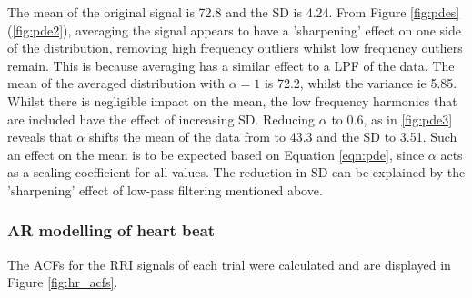 \noindent
The mean of the original signal is 72.8 and the SD is 4.24. From Figure \ref{fig:pdes}(\ref{fig:pde2}), averaging the signal appears to have a 'sharpening' effect on one side of the distribution, removing high frequency outliers whilst low frequency outliers remain. This is because averaging has a similar effect to a LPF of the data. The mean of the averaged distribution with $\alpha = 1$ is 72.2, whilst the variance ie 5.85. Whilst there is negligible impact on the mean, the low frequency harmonics that are included have the effect of increasing SD. Reducing $\alpha $ to 0.6, as in \ref{fig:pde3} reveals that $\alpha$ shifts the mean of the data from to 43.3 and the SD to 3.51. Such an effect on the mean is to be expected based on Equation \ref{eqn:pde}, since $\alpha$ acts as a scaling coefficient for all values. The reduction in SD can be explained by the 'sharpening' effect of low-pass filtering mentioned above.

\subsubsection{AR modelling of heart beat}

The ACFs for the RRI signals of each trial were calculated and are displayed in Figure \ref{fig:hr_acfs}.

